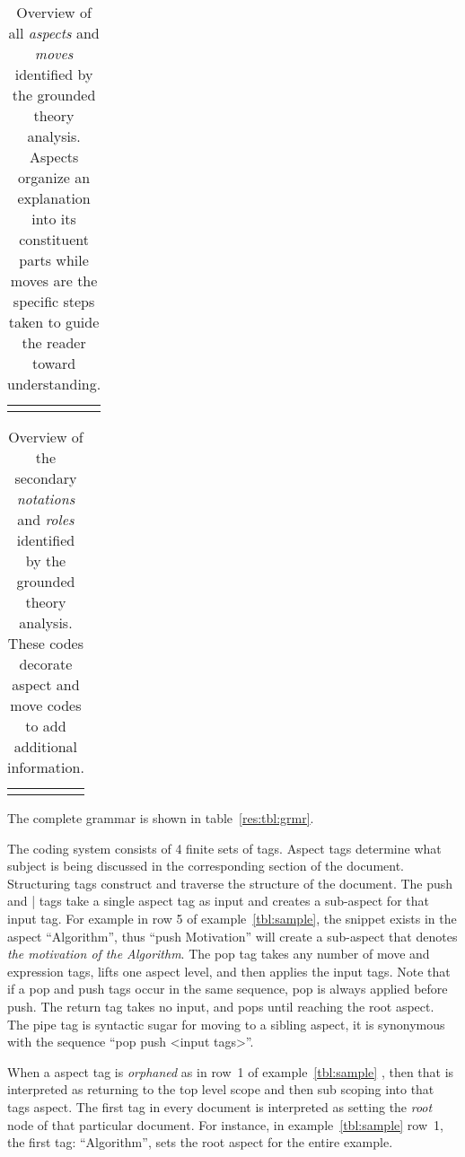 \documentclass[sigconf]{acmart}
\begin{document}
\begin{table}
\begin{tabular}{ll}

\\[-1.5ex]

\\[-1.5ex]
\end{tabular}
\caption{Overview of all \emph{aspects} and \emph{moves} identified by the grounded theory
analysis. Aspects organize an explanation into its constituent parts while
moves are the specific steps taken to guide the reader toward understanding.}
\label{tbl:codes:main}
\end{table}


\begin{table}
\begin{tabular}{ll}

\\[-1.5ex]

\\[-1.5ex]
\end{tabular}
\caption{Overview of the secondary \emph{notations} and \emph{roles} identified
by the grounded theory analysis. These codes decorate aspect and move codes to
add additional information.}
\label{tbl:codes:dec}
\end{table}

The complete grammar is shown in table~\ref{res:tbl:grmr}.



The coding system consists of 4 finite sets of tags. Aspect tags determine what
subject is being discussed in the corresponding section of the document.
%
Structuring tags construct and traverse the structure of the document. The
push and | tags take a single aspect tag as input and creates a sub-aspect
for that input tag. For example in row 5 of example~\ref{tbl:sample}, the
snippet exists in the aspect ``Algorithm'', thus ``push Motivation'' will
create a sub-aspect that denotes \emph{the motivation of the Algorithm}.
%
The pop tag takes any number of move and expression tags, lifts one aspect
level, and then applies the input tags. Note that if a pop and push tags occur
in the same sequence, pop is always applied before push. The return tag takes no
input, and pops until reaching the root aspect. The pipe tag is syntactic sugar
for moving to a sibling aspect, it is synonymous with the sequence ``pop push
<input tags>''.


When a aspect tag is \emph{orphaned} as in row~1 of example~\ref{tbl:sample}
, then that is interpreted as returning to the
top level scope and then sub scoping into that tags aspect. The first tag in
every document is interpreted as setting the \emph{root} node of that particular
document. For instance, in example~\ref{tbl:sample} row~1, the first tag:
``Algorithm'', sets the root aspect for the entire example.
\end{document}
